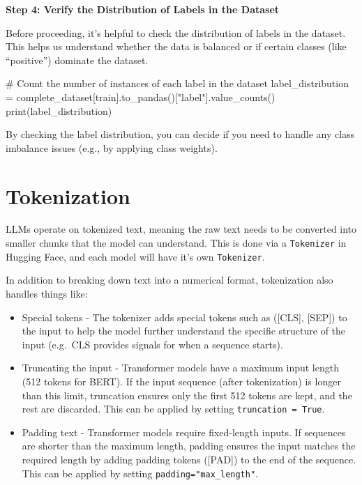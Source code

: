 \documentclass[
  letterpaper,
  DIV=11,
  numbers=noendperiod]{scrreprt}
\newenvironment{Shaded}{\begin{snugshade}}{\end{snugshade}}
\newcommand{\BuiltInTok}[1]{\textcolor[rgb]{0.00,0.23,0.31}{#1}}
\newcommand{\CommentTok}[1]{\textcolor[rgb]{0.37,0.37,0.37}{#1}}
\newcommand{\NormalTok}[1]{\textcolor[rgb]{0.00,0.23,0.31}{#1}}
\newcommand{\OperatorTok}[1]{\textcolor[rgb]{0.37,0.37,0.37}{#1}}
\newcommand{\StringTok}[1]{\textcolor[rgb]{0.13,0.47,0.30}{#1}}
\providecommand{\tightlist}{%
  \setlength{\itemsep}{0pt}\setlength{\parskip}{0pt}}\usepackage{longtable,booktabs,array}
\begin{document}
\textbf{Step 4: Verify the Distribution of Labels in the Dataset}

Before proceeding, it's helpful to check the distribution of labels in
the dataset. This helps us understand whether the data is balanced or if
certain classes (like ``positive'') dominate the dataset.

\begin{Shaded}
\begin{Highlighting}[]
\CommentTok{\# Count the number of instances of each label in the dataset}
\NormalTok{label\_distribution }\OperatorTok{=}\NormalTok{ complete\_dataset[}\StringTok{\textquotesingle{}train\textquotesingle{}}\NormalTok{].to\_pandas()[}\StringTok{"label"}\NormalTok{].value\_counts()}
\BuiltInTok{print}\NormalTok{(label\_distribution)}
\end{Highlighting}
\end{Shaded}

By checking the label distribution, you can decide if you need to handle
any class imbalance issues (e.g., by applying class weights).

\section{Tokenization}\label{tokenization}

LLMs operate on tokenized text, meaning the raw text needs to be
converted into smaller chunks that the model can understand. This is
done via a \texttt{Tokenizer} in Hugging Face, and each model will have
it's own \texttt{Tokenizer}.

In addition to breaking down text into a numerical format, tokenization
also handles things like:

\begin{itemize}
\tightlist
\item
  Special tokens - The tokenizer adds special tokens such as ({[}CLS{]},
  {[}SEP{]}) to the input to help the model further understand the
  specific structure of the input (e.g.~CLS provides signals for when a
  sequence starts).
\item
  Truncating the input - Transformer models have a maximum input length
  (512 tokens for BERT). If the input sequence (after tokenization) is
  longer than this limit, truncation ensures only the first 512 tokens
  are kept, and the rest are discarded. This can be applied by setting
  \texttt{truncation\ =\ True}.
\item
  Padding text - Transformer models require fixed-length inputs. If
  sequences are shorter than the maximum length, padding ensures the
  input matches the required length by adding padding tokens ({[}PAD{]})
  to the end of the sequence. This can be applied by setting
  \texttt{padding="max\_length"}.
\end{itemize}
\end{document}
